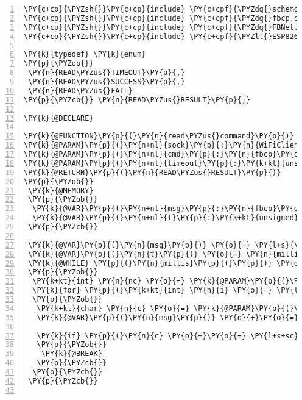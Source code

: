\begin{Verbatim}[commandchars=\\\{\},numbers=left,firstnumber=1,stepnumber=1,frame=leftline,numbersep=0pt]
\PY{c+cp}{\PYZsh{}}\PY{c+cp}{include} \PY{c+cpf}{\PYZdq{}schemo.h\PYZdq{}}
\PY{c+cp}{\PYZsh{}}\PY{c+cp}{include} \PY{c+cpf}{\PYZdq{}fbcp.common.h\PYZdq{}}
\PY{c+cp}{\PYZsh{}}\PY{c+cp}{include} \PY{c+cpf}{\PYZdq{}FBNet.h\PYZdq{}}
\PY{c+cp}{\PYZsh{}}\PY{c+cp}{include} \PY{c+cpf}{\PYZlt{}ESP8266WiFi.h\PYZgt{}}

\PY{k}{typedef} \PY{k}{enum}
\PY{p}{\PYZob{}}
 \PY{n}{READ\PYZus{}TIMEOUT}\PY{p}{,}
 \PY{n}{READ\PYZus{}SUCCESS}\PY{p}{,}
 \PY{n}{READ\PYZus{}FAIL}
\PY{p}{\PYZcb{}} \PY{n}{READ\PYZus{}RESULT}\PY{p}{;}

\PY{k}{@DECLARE}

\PY{k}{@FUNCTION}\PY{p}{(}\PY{n}{read\PYZus{}command}\PY{p}{)}
\PY{k}{@PARAM}\PY{p}{(}\PY{n+nl}{sock}\PY{p}{:}\PY{n}{WiFiClient}\PY{o}{*}\PY{p}{)}
\PY{k}{@PARAM}\PY{p}{(}\PY{n+nl}{cmd}\PY{p}{:}\PY{n}{fbcp}\PY{o}{:}\PY{o}{:}\PY{n}{COMMAND\PYZus{}LINE}\PY{o}{*}\PY{p}{)}
\PY{k}{@PARAM}\PY{p}{(}\PY{n+nl}{timeout}\PY{p}{:}\PY{k+kt}{unsigned} \PY{k+kt}{long}\PY{p}{)}
\PY{k}{@RETURN}\PY{p}{(}\PY{n}{READ\PYZus{}RESULT}\PY{p}{)}
\PY{p}{\PYZob{}}
 \PY{k}{@MEMORY}
 \PY{p}{\PYZob{}}
  \PY{k}{@VAR}\PY{p}{(}\PY{n+nl}{msg}\PY{p}{:}\PY{n}{fbcp}\PY{o}{:}\PY{o}{:}\PY{n}{string}\PY{p}{)}
  \PY{k}{@VAR}\PY{p}{(}\PY{n+nl}{t}\PY{p}{:}\PY{k+kt}{unsigned} \PY{k+kt}{long}\PY{p}{)}
 \PY{p}{\PYZcb{}} 
 
 \PY{k}{@VAR}\PY{p}{(}\PY{n}{msg}\PY{p}{)} \PY{o}{=} \PY{l+s}{\PYZdq{}}\PY{l+s}{\PYZdq{}}\PY{p}{;}
 \PY{k}{@VAR}\PY{p}{(}\PY{n}{t}\PY{p}{)} \PY{o}{=} \PY{n}{millis}\PY{p}{(}\PY{p}{)}\PY{p}{;}
 \PY{k}{@WHILE} \PY{p}{(}\PY{n}{millis}\PY{p}{(}\PY{p}{)} \PY{o}{\PYZhy{}} \PY{k}{@VAR}\PY{p}{(}\PY{n}{t}\PY{p}{)} \PY{o}{\PYZlt{}} \PY{k}{@PARAM}\PY{p}{(}\PY{n}{timeout}\PY{p}{)}\PY{p}{)}
 \PY{p}{\PYZob{}}
  \PY{k+kt}{int} \PY{n}{nc} \PY{o}{=} \PY{k}{@PARAM}\PY{p}{(}\PY{n}{sock}\PY{p}{)}\PY{o}{\PYZhy{}}\PY{o}{\PYZgt{}}\PY{n}{available}\PY{p}{(}\PY{p}{)}\PY{p}{;}
  \PY{k}{for} \PY{p}{(}\PY{k+kt}{int} \PY{n}{i} \PY{o}{=} \PY{l+m+mi}{0}\PY{p}{;} \PY{n}{i} \PY{o}{\PYZlt{}} \PY{n}{nc}\PY{p}{;} \PY{o}{+}\PY{o}{+}\PY{n}{i}\PY{p}{)}
  \PY{p}{\PYZob{}}
   \PY{k+kt}{char} \PY{n}{c} \PY{o}{=} \PY{k}{@PARAM}\PY{p}{(}\PY{n}{sock}\PY{p}{)}\PY{o}{\PYZhy{}}\PY{o}{\PYZgt{}}\PY{n}{read}\PY{p}{(}\PY{p}{)}\PY{p}{;}
   \PY{k}{@VAR}\PY{p}{(}\PY{n}{msg}\PY{p}{)} \PY{o}{+}\PY{o}{=} \PY{n}{c}\PY{p}{;}
   
   \PY{k}{if} \PY{p}{(}\PY{n}{c} \PY{o}{=}\PY{o}{=} \PY{l+s+sc}{\PYZsq{}\PYZbs{}n\PYZsq{}} \PY{n}{or} \PY{n}{c} \PY{o}{=}\PY{o}{=} \PY{l+s+sc}{\PYZsq{}\PYZbs{}0\PYZsq{}}\PY{p}{)}
   \PY{p}{\PYZob{}}
    \PY{k}{@BREAK}
   \PY{p}{\PYZcb{}}
  \PY{p}{\PYZcb{}}
 \PY{p}{\PYZcb{}}
 

\end{Verbatim}
